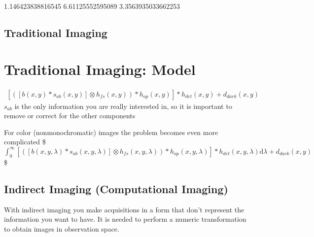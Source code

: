 \documentclass[letterpaper,10pt,english]{sphinxmanual}
\begin{document}
\begin{sphinxVerbatim}[commandchars=\\\{\}]
1.146423838816545 6.61125552595089 3.3563935033662253
\end{sphinxVerbatim}

\noindent{}


\subsection{Traditional Imaging}
\label{\detokenize{01-Introduction:traditional-imaging}}





\section{Traditional Imaging: Model}
\label{\detokenize{01-Introduction:traditional-imaging-model}}
\sphinxAtStartPar
{}
\begin{equation*}
\begin{split}
\left[\left([b(x,y)*s_{ab}(x,y)]\otimes h_{fs}(x,y)\right)*h_{op}(x,y)\right]*h_{det}(x,y)+d_{dark}(x,y)
\end{split}
\end{equation*}
\sphinxAtStartPar
\(s_{ab}\) is the only information you are really interested in, so it is important to remove or correct for the other components

\sphinxAtStartPar
For color (non\sphinxhyphen{}monochromatic) images the problem becomes even more complicated
\$\(
\int_{0}^{\infty} {\left[\left([b(x,y,\lambda)*s_{ab}(x,y,\lambda)]\otimes h_{fs}(x,y,\lambda)\right)*h_{op}(x,y,\lambda)\right]*h_{det}(x,y,\lambda)}\mathrm{d}\lambda+d_{dark}(x,y)
\)\$


\subsection{Indirect Imaging (Computational Imaging)}
\label{\detokenize{01-Introduction:indirect-imaging-computational-imaging}}
\sphinxAtStartPar
With indirect imaging you make acquisitions in a form that don’t represent the information you want to have. It is needed to perform a numeric transformation to obtain images in observation space.
\end{document}
